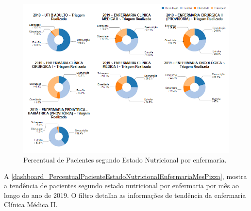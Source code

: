 \begin{figure}[htb]
	\caption{\label{dashboard_PercentualPacienteEstadoNutricionalEnfermariaAnoPizza}Percentual de Pacientes segundo Estado Nutricional por enfermaria.}
	\begin{center}
	    \includegraphics[scale=0.6]{Imagens/3.3.PercentualPacienteEstadoNutricionalEnfermariaAnoPizza.png}
	\end{center}
\end{figure}

\newpage
A \autoref{dashboard_PercentualPacienteEstadoNutricionalEnfermariaMesPizza}, mostra a tendência de pacientes segundo estado nutricional por enfermaria por mês ao longo do ano de 2019. O filtro detalha as informações de tendência da enfermaria Clínica Médica II.

